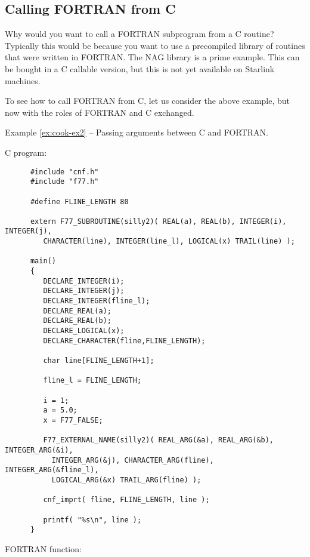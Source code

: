 \subsection{Calling FORTRAN from C}

Why would you want to call a FORTRAN subprogram from a C routine? Typically
this would be because you want to use a precompiled library of routines that
were written in FORTRAN. The NAG library is a prime example. This can be bought
in a C callable version, but this is not yet available on Starlink machines.

To see how to call FORTRAN from C, let us consider the above example, but now
with the roles of FORTRAN and C exchanged.

\label{ex:cook-ex2}
\begin{center}
Example \ref{ex:cook-ex2} -- Passing arguments between C and FORTRAN.
\end{center}
\nopagebreak[4]
C program:
{\small \begin{verbatim}
      #include "cnf.h"
      #include "f77.h"

      #define FLINE_LENGTH 80
      
      extern F77_SUBROUTINE(silly2)( REAL(a), REAL(b), INTEGER(i), INTEGER(j),
         CHARACTER(line), INTEGER(line_l), LOGICAL(x) TRAIL(line) );

      main()
      {
         DECLARE_INTEGER(i);
         DECLARE_INTEGER(j);
         DECLARE_INTEGER(fline_l);
         DECLARE_REAL(a);
         DECLARE_REAL(b);
         DECLARE_LOGICAL(x);
         DECLARE_CHARACTER(fline,FLINE_LENGTH);

         char line[FLINE_LENGTH+1];

         fline_l = FLINE_LENGTH;

         i = 1;
         a = 5.0;
         x = F77_FALSE;

         F77_EXTERNAL_NAME(silly2)( REAL_ARG(&a), REAL_ARG(&b), INTEGER_ARG(&i),
           INTEGER_ARG(&j), CHARACTER_ARG(fline), INTEGER_ARG(&fline_l),
           LOGICAL_ARG(&x) TRAIL_ARG(fline) );

         cnf_imprt( fline, FLINE_LENGTH, line );

         printf( "%s\n", line );
      }
\end{verbatim} }
\pagebreak[3]
FORTRAN function:


